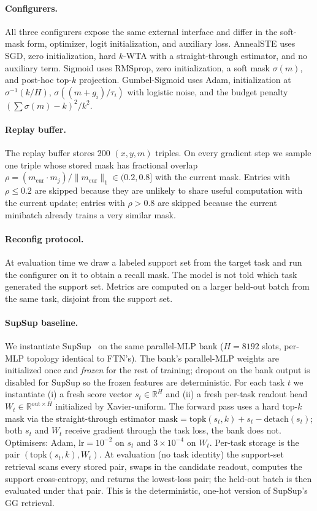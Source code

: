 \documentclass[11pt]{article}
\begin{document}
\paragraph{Configurers.}
All three configurers expose the same external interface and differ in the soft-mask form, optimizer, logit initialization, and auxiliary loss. AnnealSTE uses SGD, zero initialization, hard $k$-WTA with a straight-through estimator, and no auxiliary term. Sigmoid uses RMSprop, zero initialization, a soft mask $\sigma(m)$, and post-hoc top-$k$ projection. Gumbel-Sigmoid uses Adam, initialization at $\sigma^{-1}(k/H)$, $\sigma((m+g_i)/\tau_i)$ with logistic noise, and the budget penalty $(\sum\sigma(m)-k)^2/k^2$.

\paragraph{Replay buffer.}
The replay buffer stores 200 $(x,y,m)$ triples. On every gradient step we sample one triple whose stored mask has fractional overlap $\rho=(m_\mathrm{cur}\cdot m_j)/\|m_\mathrm{cur}\|_1\in(0.2,0.8]$ with the current mask. Entries with $\rho\le0.2$ are skipped because they are unlikely to share useful computation with the current update; entries with $\rho>0.8$ are skipped because the current minibatch already trains a very similar mask.

\paragraph{Reconfig protocol.}
At evaluation time we draw a labeled support set from the target task and run the configurer on it to obtain a recall mask. The model is not told which task generated the support set. Metrics are computed on a larger held-out batch from the same task, disjoint from the support set.

\paragraph{SupSup baseline.}
We instantiate SupSup~\citep{wortsman2020supermasks} on the same parallel-MLP bank ($H=8192$ slots, per-MLP topology identical to FTN's). The bank's parallel-MLP weights are initialized once and \emph{frozen} for the rest of training; dropout on the bank output is disabled for SupSup so the frozen features are deterministic. For each task $t$ we instantiate (i) a fresh score vector $s_t\in\mathbb{R}^H$ and (ii) a fresh per-task readout head $W_t \in \mathbb{R}^{\mathrm{out}\times H}$ initialized by Xavier-uniform. The forward pass uses a hard top-$k$ mask via the straight-through estimator $\mathrm{mask} = \mathrm{topk}(s_t, k) + s_t - \mathrm{detach}(s_t)$; both $s_t$ and $W_t$ receive gradient through the task loss, the bank does not. Optimisers: Adam, $\mathrm{lr}=10^{-2}$ on $s_t$ and $3\times10^{-4}$ on $W_t$. Per-task storage is the pair $(\mathrm{topk}(s_t,k), W_t)$. At evaluation (no task identity) the support-set retrieval scans every stored pair, swaps in the candidate readout, computes the support cross-entropy, and returns the lowest-loss pair; the held-out batch is then evaluated under that pair. This is the deterministic, one-hot version of SupSup's GG retrieval.
\end{document}
